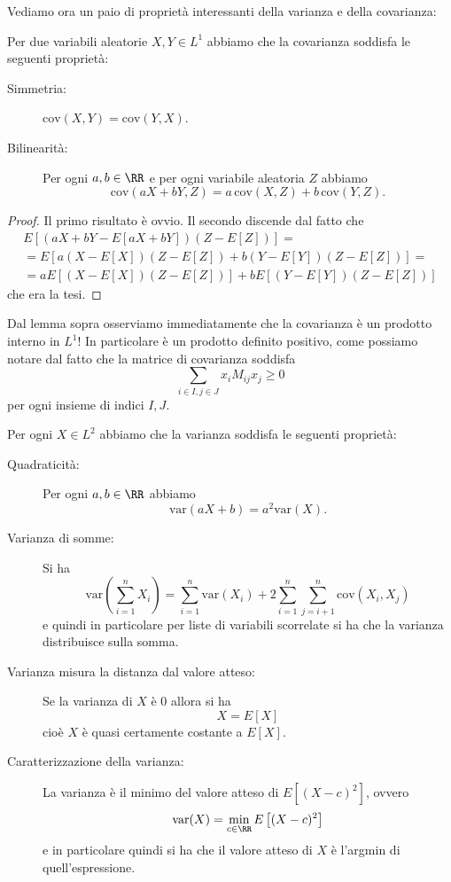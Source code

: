 \documentclass[11pt]{scrartcl}
\begin{document}
	Vediamo ora un paio di proprietà interessanti della varianza e della covarianza:
	\begin{proposition}
		Per due variabili aleatorie $X,Y\in L^1$ abbiamo che la covarianza soddisfa le seguenti proprietà:
		\begin{description}
			\item[Simmetria:] $\text{cov}(X,Y)=\text{cov}(Y,X)$.
			\item[Bilinearità:] Per ogni $a,b\in \RR$ e per ogni variabile aleatoria $Z$ abbiamo
			$$\text{cov}(aX+bY,Z)=a\,\text{cov}(X,Z)+b\,\text{cov}(Y,Z).$$
		\end{description}
	\end{proposition}
	\begin{proof}
		Il primo risultato è ovvio. Il secondo discende dal fatto che
		\begin{align*}
			E\left[(aX+bY-E[aX+bY])(Z-E[Z])\right]= \\
			=E\left[a(X-E[X])(Z-E[Z])+b(Y-E[Y])(Z-E[Z])\right]= \\
			=aE\left[(X-E[X])(Z-E[Z])\right]+bE\left[(Y-E[Y])(Z-E[Z])\right]
		\end{align*}
		che era la tesi.
	\end{proof}
	\begin{remark}
		Dal lemma sopra osserviamo immediatamente che la covarianza è un prodotto interno in $L^1$! In particolare è un prodotto definito positivo, come possiamo notare dal fatto che la matrice di covarianza soddisfa
		$$\sum_{i\in I,j\in J}x_iM_{ij}x_j\ge 0$$
		per ogni insieme di indici $I,J$.
	\end{remark}
	\begin{corollary}
		Per ogni $X\in L^2$ abbiamo che la varianza soddisfa le seguenti proprietà:
		\begin{description}
			\item[Quadraticità:] Per ogni $a,b\in\RR$ abbiamo
			$$\text{var}(aX+b)=a^2\text{var}(X).$$
			\item[Varianza di somme:] Si ha
			$$\text{var}\left(\sum_{i=1}^{n}X_i\right)=\sum_{i=1}^{n}\text{var}(X_i)+2\sum_{i=1}^{n}\sum_{j=i+1}^{n}\text{cov}(X_i,X_j)$$
			e quindi in particolare per liste di variabili scorrelate si ha che la varianza distribuisce sulla somma.
			\item[Varianza misura la distanza dal valore atteso:] Se la varianza di $X$ è $0$ allora si ha
			$$X=E[X]$$
			cioè $X$ è quasi certamente costante a $E[X]$.
			\item[Caratterizzazione della varianza:] La varianza è il minimo del valore atteso di $E[(X-c)^2]$, ovvero
			$$\text{var}(X)=\min_{c\in\RR}E\left[(X-c)^2\right]$$
			e in particolare quindi si ha che il valore atteso di $X$ è l'argmin di quell'espressione.
		\end{description}
	\end{corollary}
\end{document}
